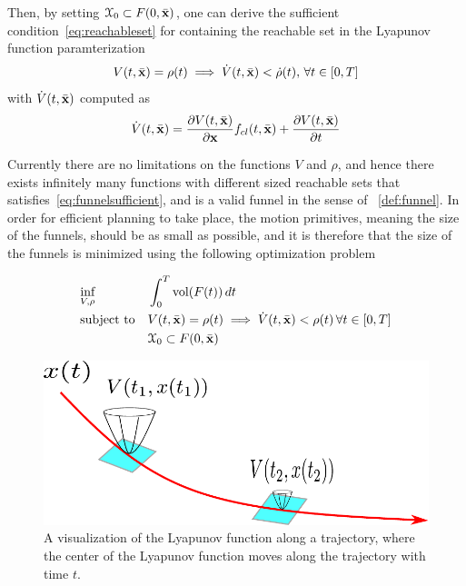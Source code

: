 Then, by setting \(\mathcal{X}_0 \subset F(0,\bar{\mathbf{x}})\), one can derive
the sufficient condition~\cref{eq:reachableset} for containing the reachable set
in the Lyapunov function paramterization
\begin{equation}
  \label{eq:funnelsufficient}
  V(t,\bar{\mathbf{x}}) = \rho(t) \implies \dot{V}(t,\bar{\mathbf{x}}) < \dot{\rho}(t), \, \forall t \in [0,T]
\end{equation}
with \(\dot{V}(t,\bar{\mathbf{x}})\) computed as
\begin{equation}
  \dot{V}(t,\bar{\mathbf{x}}) = \frac{\partial V(t,\bar{\mathbf{x}})}{\partial \mathbf{x}} f_{cl}(t,\bar{\mathbf{x}}) + \frac{\partial V(t,\bar{\mathbf{x}})}{\partial t}
\end{equation}

Currently there are no limitations on the functions \(V\) and \(\rho\), and
hence there exists infinitely many functions with different sized reachable sets
that satisfies~\cref{eq:funnelsufficient}, and is a valid funnel in the sense of
~\cref{def:funnel}. In order for efficient planning to take place, the motion
primitives, meaning the size of the funnels, should be as small as possible, and
it is therefore that the size of the funnels is minimized using the following
optimization problem~\cite{majumdarFunnelLibrariesRealtime2017}

\begin{align}
  \label{eq:funneloptimizationproblem}
  &\underset{V,\rho}{\text{inf}} \; &&\int_{0}^{T} \operatorname{vol}(F(t))\, dt \\
  &\text{subject to} && V(t,\bar{\mathbf{x}}) = \rho (t) \implies \dot{V}(t,\bar{\mathbf{x}}) < \rho (t) \, \forall t \in [0,T] \\
  && &\mathcal{X}_0 \subset F(0,\bar{\mathbf{x}}) \\
\end{align} 

\begin{figure}
  \centering
  \includegraphics[scale=.7]{figures/experiments/lyapunov_visualization}
  \caption{A visualization of the Lyapunov function along a trajectory, where
    the center of the Lyapunov function moves along the trajectory with time
    \(t\).}
\end{figure}


